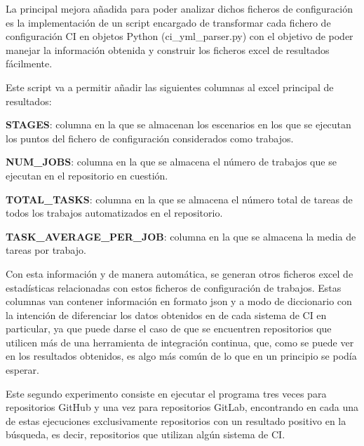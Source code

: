 La principal mejora añadida para poder analizar dichos ficheros de configuración es la implementación de un script encargado de transformar cada fichero de configuración CI en objetos Python (ci\_yml\_parser.py) con el objetivo de poder manejar la información obtenida y construir los ficheros excel de resultados fácilmente.

Este script va a permitir añadir las siguientes columnas al excel principal de resultados:
\begin{compactitem}
    \item \textbf{STAGES}: columna en la que se almacenan los escenarios en los que se ejecutan los puntos del fichero de configuración considerados como trabajos.
    \item \textbf{NUM\_JOBS}: columna en la que se almacena el número de trabajos que se ejecutan en el repositorio en cuestión.
    \item \textbf{TOTAL\_TASKS}: columna en la que se almacena el número total de tareas de todos los trabajos automatizados en el repositorio.
    \item \textbf{TASK\_AVERAGE\_PER\_JOB}: columna en la que se almacena la media de tareas por trabajo.
\end{compactitem}

Con esta información y de manera automática, se generan otros ficheros excel de estadísticas relacionadas con estos ficheros de configuración de trabajos. Estas columnas van contener información en formato json y a modo de diccionario con la intención de diferenciar los datos obtenidos en de cada sistema de CI en particular, ya que puede darse el caso de que se encuentren repositorios que utilicen más de una herramienta de integración continua, que, como se puede ver en los resultados obtenidos, es algo más común de lo que en un principio se podía esperar.

Este segundo experimento consiste en ejecutar el programa tres veces para repositorios GitHub y una vez para repositorios GitLab, encontrando en cada una de estas ejecuciones exclusivamente repositorios con un resultado positivo en la búsqueda, es decir, repositorios que utilizan algún sistema de CI. 

